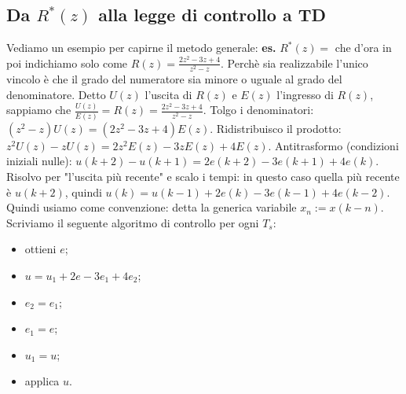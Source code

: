    \subsection{Da $R^*(z)$ alla legge di controllo a TD}
    Vediamo un esempio per capirne il metodo generale:\newline
    \textbf{es.} $R^*(z) = $ che d'ora in poi indichiamo solo come $R(z) = \frac{2z^2 - 3z +4}{z^2 -z}$. \newline
    Perchè sia realizzabile l'unico vincolo è che il grado del numeratore sia minore o uguale al grado del denominatore.\newline
    Detto $U(z)$ l'uscita di $R(z)$ e $E(z)$ l'ingresso di $R(z)$, sappiamo che $\frac{U(z)}{E(z)} = R(z) = \frac{2z^2 - 3z +4}{z^2 -z}$.\newline
    Tolgo i denominatori: $(z^2-z) U(z) = (2z^2 -3z+4) E(z)$.\newline
    Ridistribuisco il prodotto: $z^2 U(z) - z U(z) = 2z^2 E(z) - 3zE(z) + 4 E(z)$.\newline
    Antitrasformo (condizioni iniziali nulle): $u(k+2) - u(k+1) = 2e(k+2) -3e(k+1) + 4e(k)$.\newline
    Risolvo per "l'uscita più recente" e scalo i tempi: in questo caso quella più recente è $u(k+2)$, quindi $u(k) = u(k-1) + 2 e(k) -3e(k-1) + 4e(k-2)$.\newline
    Quindi usiamo come convenzione: detta la generica variabile $x_n := x(k-n)$.\newline
    Scriviamo il seguente algoritmo di controllo per ogni $T_s$:
    \begin{itemize}
        \item ottieni $e$;
        \item $u = u_1 +  2e - 3e_1 + 4e_2$;
        \item $e_2 = e_1$;
        \item $e_1 = e$;
        \item $u_1 = u$;
        \item applica $u$.
    \end{itemize}
